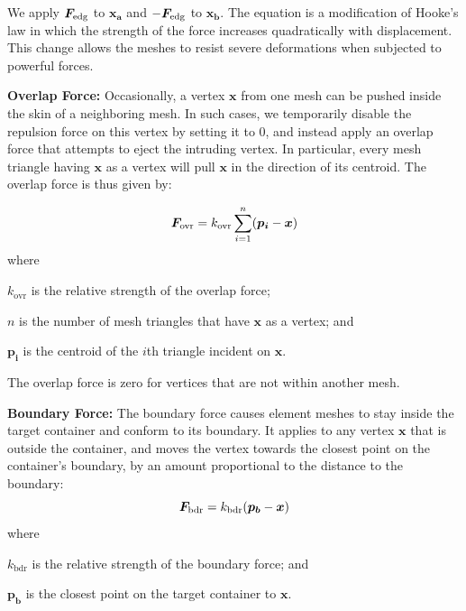 We apply $\bm{F}_\mathrm{edg}$ to $\bm{x_{a}}$ and $-\bm{F}_\mathrm{edg}$ to $\bm{x_{b}}$.
The equation is a modification of Hooke's law
in which the strength of the force increases quadratically
with displacement.
This change allows the meshes to resist severe deformations
when subjected to powerful forces.




\medskip
\textbf{Overlap Force:}
Occasionally, a vertex $\bm{x}$ from one mesh can be pushed inside the skin of a
neighboring mesh.  In such cases, we temporarily disable the repulsion force
on this vertex
by setting it to 0, and instead apply an overlap force that attempts to
eject the intruding vertex.  In particular, every mesh triangle having $\bm{x}$
as a vertex will pull $\bm{x}$ in the direction of its centroid.  The overlap
force is thus given by:

\begin{equation}
\bm{F}_\mathrm{ovr} = k_\mathrm{ovr} \sum_{i = 1}^{n} (\bm{p_{i}} - \bm{x})
\end{equation}
where
\begin{packeddescriptions}
	\item[$k_\mathrm{ovr}$] is the relative strength of the overlap force;
	\item[$n$] is the number of mesh triangles that have $\bm{x}$ as a vertex; and
	\item[$\bm{p_{i}}$] is the centroid of the $i$th triangle incident on $\bm{x}$.
\end{packeddescriptions}

The overlap force is zero for vertices that are not within another mesh.

\medskip
\textbf{Boundary Force:}
The boundary force causes element meshes to stay inside the target container
and conform to its boundary. It applies to any vertex $\bm{x}$ that
is outside the container, and moves the vertex towards the closest point
on the container's boundary, by an amount proportional to the distance to
the boundary:
\begin{equation}
\bm{F}_\mathrm{bdr} = k_\mathrm{bdr} (\bm{p_b} - \bm{x})
\end{equation}
where
\begin{packeddescriptions}
	\item[$k_\mathrm{bdr}$] is the relative strength of the boundary force; and
	\item[$\bm{p_b}$] is the closest point on the target container to $\bm{x}$.
\end{packeddescriptions}

